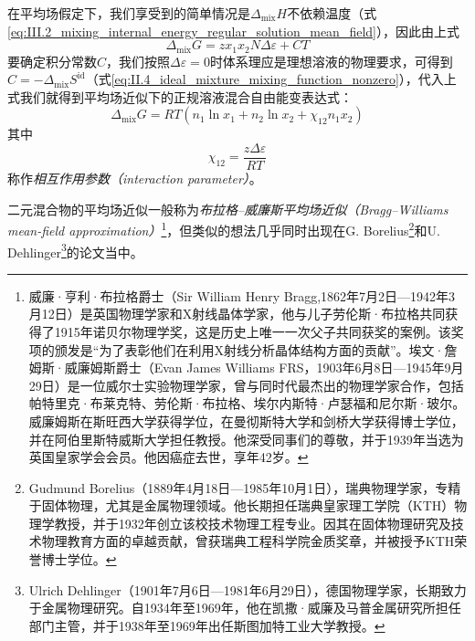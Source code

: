 \documentclass[main.tex]{subfiles}
\begin{document}
在平均场假定下，我们享受到的简单情况是$\Delta_\text{mix}H$不依赖温度（式\eqref{eq:III.2_mixing_internal_energy_regular_solution_mean_field}），因此由上式
\[\Delta_\text{mix}G=zx_1x_2N\Delta\varepsilon+CT\]
要确定积分常数$C$，我们按照$\Delta\varepsilon=0$时体系理应是理想溶液的物理要求，可得到$C=-\Delta_\text{mix}S^\text{id}$（式\eqref{eq:II.4_ideal_mixture_mixing_function_nonzero}），代入上式我们就得到平均场近似下的正规溶液混合自由能变表达式：
\begin{equation}
  \Delta_\text{mix}G=RT\left(n_1\ln x_1+n_2\ln x_2+\chi_{12}n_1x_2\right)
\end{equation}
其中
\[\chi_{12}=\frac{z\Delta\varepsilon}{RT}\]
称作\emph{相互作用参数（interaction parameter）}。

二元混合物的平均场近似一般称为\emph{布拉格--威廉斯平均场近似（Bragg--Williams mean-field approximation）}\cite{Bragg1934,Bragg1935}\footnote{威廉·亨利·布拉格爵士（Sir William Henry Bragg,1862年7月2日—1942年3月12日）是英国物理学家和X射线晶体学家，他与儿子劳伦斯·布拉格共同获得了1915年诺贝尔物理学奖，这是历史上唯一一次父子共同获奖的案例。该奖项的颁发是“为了表彰他们在利用X射线分析晶体结构方面的贡献”。埃文·詹姆斯·威廉姆斯爵士（Evan James Williams FRS，1903年6月8日—1945年9月29日）是一位威尔士实验物理学家，曾与同时代最杰出的物理学家合作，包括帕特里克·布莱克特、劳伦斯·布拉格、埃尔内斯特·卢瑟福和尼尔斯·玻尔。威廉姆斯在斯旺西大学获得学位，在曼彻斯特大学和剑桥大学获得博士学位，并在阿伯里斯特威斯大学担任教授。他深受同事们的尊敬，并于1939年当选为英国皇家学会会员。他因癌症去世，享年42岁。}，但类似的想法几乎同时出现在G. Borelius\cite{Borelius1934}\footnote{Gudmund Borelius（1889年4月18日—1985年10月1日），瑞典物理学家，专精于固体物理，尤其是金属物理领域。他长期担任瑞典皇家理工学院（KTH）物理学教授，并于1932年创立该校技术物理工程专业。因其在固体物理研究及技术物理教育方面的卓越贡献，曾获瑞典工程科学院金质奖章，并被授予KTH荣誉博士学位。}和U. Dehlinger\cite{Dehlinger1934}\footnote{Ulrich Dehlinger（1901年7月6日—1981年6月29日），德国物理学家，长期致力于金属物理研究。自1934年至1969年，他在凯撒·威廉及马普金属研究所担任部门主管，并于1938年至1969年出任斯图加特工业大学教授。}的论文当中。
\end{document}
